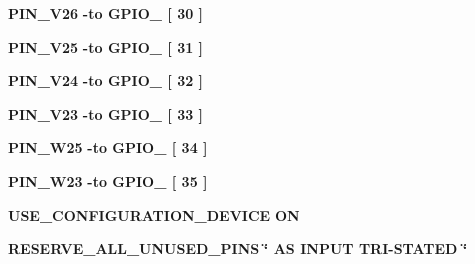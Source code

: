 \begin{DoxyCompactItemize}
\item 
{\bf P\+I\+N\+\_\+\+V26} {\bfseries \textcolor{vhdlchar}{-\/}\textcolor{keywordflow}{to}\textcolor{vhdlchar}{ }\textcolor{vhdlchar}{G\+P\+I\+O\+\_}\textcolor{vhdlchar}{ }\textcolor{vhdlchar}{[}\textcolor{vhdlchar}{ } \textcolor{vhdldigit}{30} \textcolor{vhdlchar}{ }\textcolor{vhdlchar}{]}\textcolor{vhdlchar}{ }} 
\item 
{\bf P\+I\+N\+\_\+\+V25} {\bfseries \textcolor{vhdlchar}{-\/}\textcolor{keywordflow}{to}\textcolor{vhdlchar}{ }\textcolor{vhdlchar}{G\+P\+I\+O\+\_}\textcolor{vhdlchar}{ }\textcolor{vhdlchar}{[}\textcolor{vhdlchar}{ } \textcolor{vhdldigit}{31} \textcolor{vhdlchar}{ }\textcolor{vhdlchar}{]}\textcolor{vhdlchar}{ }} 
\item 
{\bf P\+I\+N\+\_\+\+V24} {\bfseries \textcolor{vhdlchar}{-\/}\textcolor{keywordflow}{to}\textcolor{vhdlchar}{ }\textcolor{vhdlchar}{G\+P\+I\+O\+\_}\textcolor{vhdlchar}{ }\textcolor{vhdlchar}{[}\textcolor{vhdlchar}{ } \textcolor{vhdldigit}{32} \textcolor{vhdlchar}{ }\textcolor{vhdlchar}{]}\textcolor{vhdlchar}{ }} 
\item 
{\bf P\+I\+N\+\_\+\+V23} {\bfseries \textcolor{vhdlchar}{-\/}\textcolor{keywordflow}{to}\textcolor{vhdlchar}{ }\textcolor{vhdlchar}{G\+P\+I\+O\+\_}\textcolor{vhdlchar}{ }\textcolor{vhdlchar}{[}\textcolor{vhdlchar}{ } \textcolor{vhdldigit}{33} \textcolor{vhdlchar}{ }\textcolor{vhdlchar}{]}\textcolor{vhdlchar}{ }} 
\item 
{\bf P\+I\+N\+\_\+\+W25} {\bfseries \textcolor{vhdlchar}{-\/}\textcolor{keywordflow}{to}\textcolor{vhdlchar}{ }\textcolor{vhdlchar}{G\+P\+I\+O\+\_}\textcolor{vhdlchar}{ }\textcolor{vhdlchar}{[}\textcolor{vhdlchar}{ } \textcolor{vhdldigit}{34} \textcolor{vhdlchar}{ }\textcolor{vhdlchar}{]}\textcolor{vhdlchar}{ }} 
\item 
{\bf P\+I\+N\+\_\+\+W23} {\bfseries \textcolor{vhdlchar}{-\/}\textcolor{keywordflow}{to}\textcolor{vhdlchar}{ }\textcolor{vhdlchar}{G\+P\+I\+O\+\_}\textcolor{vhdlchar}{ }\textcolor{vhdlchar}{[}\textcolor{vhdlchar}{ } \textcolor{vhdldigit}{35} \textcolor{vhdlchar}{ }\textcolor{vhdlchar}{]}\textcolor{vhdlchar}{ }} 
\item 
{\bf U\+S\+E\+\_\+\+C\+O\+N\+F\+I\+G\+U\+R\+A\+T\+I\+O\+N\+\_\+\+D\+E\+V\+I\+CE} {\bfseries \textcolor{keywordflow}{ON}\textcolor{vhdlchar}{ }} 
\item 
{\bf R\+E\+S\+E\+R\+V\+E\+\_\+\+A\+L\+L\+\_\+\+U\+N\+U\+S\+E\+D\+\_\+\+P\+I\+NS} {\bfseries \textcolor{vhdlchar}{\char`\"{}}\textcolor{vhdlchar}{ }\textcolor{vhdlchar}{AS}\textcolor{vhdlchar}{ }\textcolor{vhdlchar}{I\+N\+P\+UT}\textcolor{vhdlchar}{ }\textcolor{vhdlchar}{T\+RI}\textcolor{vhdlchar}{-\/}\textcolor{vhdlchar}{S\+T\+A\+T\+ED}\textcolor{vhdlchar}{ }\textcolor{vhdlchar}{\char`\"{}}\textcolor{vhdlchar}{ }} 

\end{DoxyCompactItemize}
